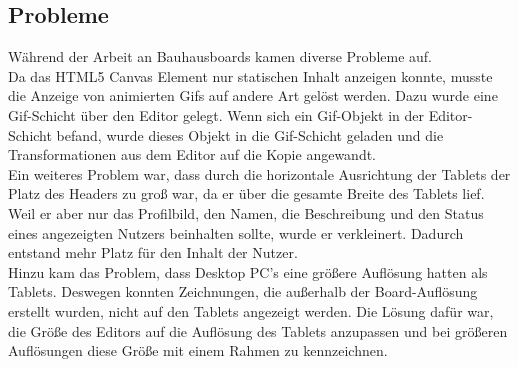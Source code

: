 \subsection{Probleme}\label{Probleme}
Während der Arbeit an Bauhausboards kamen diverse Probleme auf.
\\
Da das HTML5 Canvas Element nur statischen Inhalt anzeigen konnte, musste die Anzeige von animierten Gifs auf andere Art gelöst werden.
Dazu wurde eine Gif-Schicht über den Editor gelegt.
Wenn sich ein Gif-Objekt in der Editor-Schicht befand, wurde dieses Objekt in die Gif-Schicht geladen und die Transformationen aus dem Editor auf die Kopie angewandt.
\\
Ein weiteres Problem war, dass durch die horizontale Ausrichtung der Tablets der Platz des Headers zu groß war, da er über die gesamte Breite des Tablets lief.
Weil er aber nur das Profilbild, den Namen, die Beschreibung und den Status eines angezeigten Nutzers beinhalten sollte, wurde er verkleinert.
Dadurch entstand mehr Platz für den Inhalt der Nutzer.
\\
Hinzu kam das Problem, dass Desktop PC's eine größere Auflösung hatten als Tablets.
Deswegen konnten Zeichnungen, die außerhalb der Board-Auflösung erstellt wurden, nicht auf den Tablets angezeigt werden.
Die Lösung dafür war, die Größe des Editors auf die Auflösung des Tablets anzupassen und bei größeren Auflösungen diese Größe mit einem Rahmen zu kennzeichnen.
\\


